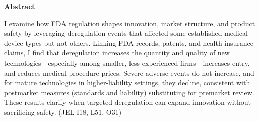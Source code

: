 \documentclass[letterpaper,12pt]{article}
\theoremstyle{definition}
\begin{document}
\begin{titlepage}
\begin{singlespace}

\vspace{-24pt}

\begin{center}
\textbf{Abstract}
\end{center}


\noindent 



I examine how FDA regulation shapes innovation, market structure, and product safety by leveraging deregulation events that affected some established medical device types but not others. Linking FDA records, patents, and health insurance claims, I find that deregulation increases the quantity and quality of new technologies---especially among smaller, less-experienced firms---increases entry, and reduces medical procedure prices. Severe adverse events do not increase, and for mature technologies in higher-liability settings, they decline, consistent with postmarket measures (standards and liability) substituting for premarket review. These results clarify when targeted deregulation can expand innovation without sacrificing safety. (JEL I18, L51, O31)\\


\end{singlespace}



\thispagestyle{empty}
\end{titlepage}
\end{document}
